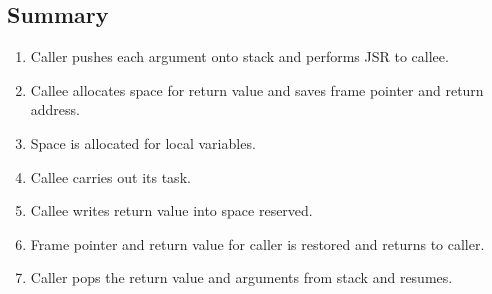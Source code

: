 \subsection{Summary}
\begin{enumerate}
    \item Caller pushes each argument onto stack and performs JSR to callee.
    \item Callee allocates space for return value and saves frame pointer and return address.
    \item Space is allocated for local variables.
    \item Callee carries out its task.
    \item Callee writes return value into space reserved.
    \item Frame pointer and return value for caller is restored and returns to caller.
    \item Caller pops the return value and arguments from stack and resumes.
\end{enumerate}







